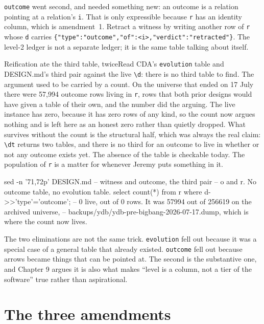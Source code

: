 \texttt{outcome} went second, and needed something new: an outcome is a relation pointing at a relation's \texttt{i}. That is only expressible because \texttt{r} has an identity column, which is amendment~1. Retract a witness by writing another row of \texttt{r} whose \texttt{d} carries \texttt{\{"type":"outcome","of":<i>,"verdict":"retracted"\}}. The level-2 ledger is not a separate ledger; it is the same table talking about itself.

\begin{Correspondence}{Reification ate the third table, twice}{Read CDA's \texttt{evolution} table and DESIGN.md's third pair against the live \texttt{\textbackslash d}: there is no third table to find.}
The argument used to be carried by a count. On the universe that ended on 17 July there were 57,994 outcome rows living in \texttt{r}, rows that both prior designs would have given a table of their own, and the number did the arguing. The live instance has zero, because it has zero rows of any kind, so the count now argues nothing and is left here as an honest zero rather than quietly dropped. What survives without the count is the structural half, which was always the real claim: \texttt{\textbackslash dt} returns two tables, and there is no third for an outcome to live in whether or not any outcome exists yet. The absence of the table is checkable today. The population of \texttt{r} is a matter for whenever Jeremy puts something in it.
\begin{Check}
sed -n '71,72p' DESIGN.md   -- witness and outcome, the third pair
\dt                         -- o and r. No outcome table, no evolution table.
select count(*) from r where d->>'type'='outcome';
--   0 live, out of 0 rows. It was 57994 out of 256619 on the archived universe,
--   backups/ydb/ydb-pre-bigbang-2026-07-17.dump, which is where the count now lives.
\end{Check}
The two eliminations are not the same trick. \texttt{evolution} fell out because it was a special case of a general table that already existed. \texttt{outcome} fell out because arrows became things that can be pointed at. The second is the substantive one, and Chapter 9 argues it is also what makes ``level is a column, not a tier of the software'' true rather than aspirational.
\end{Correspondence}

\section{The three amendments}

